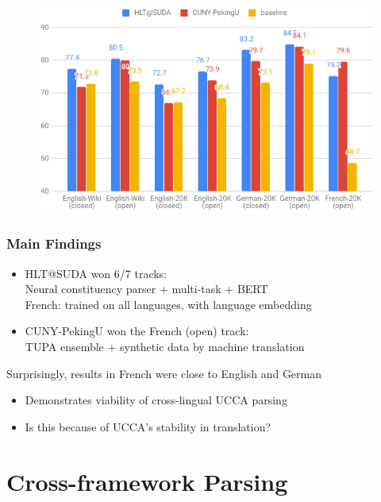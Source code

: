 \documentclass[t,xcolor={svgnames,table}]{beamer}
\begin{document}
\begin{frame}
    \begin{figure}
        \centering
        \includegraphics[width=\textwidth]{Capture}
    \end{figure}
\end{frame}



\begin{frame}
\frametitle{Main Findings}

\begin{itemize}
    \item
        HLT@SUDA won 6/7 tracks: \\
        Neural constituency parser + multi-task + BERT \\
        French: trained on all languages, with language embedding
    \pause\item
        CUNY-PekingU won the French (open) track: \\
        TUPA ensemble + synthetic data by machine translation
\end{itemize}
        \pause\vfill
        Surprisingly, results in French were close to English and German
    \begin{itemize}
        \item 
            Demonstrates viability of cross-lingual UCCA parsing
        \item
            Is this because of UCCA's stability in translation?
    \end{itemize}    
\end{frame}


\section{Cross-framework Parsing}
\end{document}
